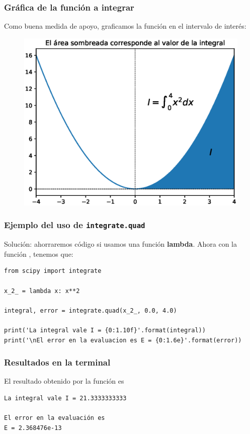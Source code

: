 \begin{frame}
\frametitle{Gráfica de la función a integrar}
Como buena medida de apoyo, graficamos la función en el intervalo de interés:
\begin{figure}[h!]
	\centering
	\includegraphics[scale=0.5]{Imagenes/integracion_modulo_quad_01.eps}
\end{figure}
\end{frame}
\begin{frame}
\frametitle{Ejemplo del uso de \texttt{integrate.quad}}
Solución: ahorraremos código si usamos una función \textbf{lambda}. Ahora con la función , tenemos que:
\begin{lstlisting}[caption=Código para evaluar la integral con \texttt{integrate.quad}, style=FormattedNumber, basicstyle=\linespread{1.1}\ttfamily=\tiny, columns=fullflexible]
from scipy import integrate

x_2_ = lambda x: x**2

integral, error = integrate.quad(x_2_, 0.0, 4.0)

print('La integral vale I = {0:1.10f}'.format(integral))
print('\nEl error en la evaluacion es E = {0:1.6e}'.format(error))
\end{lstlisting}
\end{frame}
\begin{frame}[fragile]
\frametitle{Resultados en la terminal}
El resultado obtenido por la función  es
\begin{verbatim}
La integral vale I = 21.3333333333

El error en la evaluación es
E = 2.368476e-13
\end{verbatim}
\end{frame}
